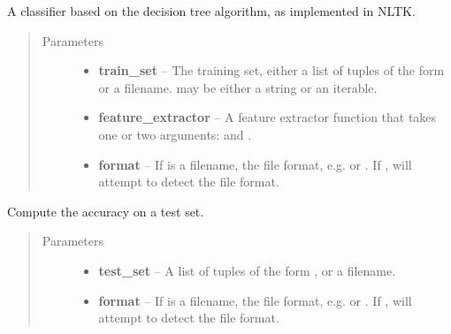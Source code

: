 \documentclass[letterpaper,10pt,english]{sphinxmanual}
\begin{document}
\begin{fulllineitems}
\label{api_reference:textblob.classifiers.DecisionTreeClassifier}
A classifier based on the decision tree algorithm, as implemented in
NLTK.
\begin{quote}\begin{description}
\item[{Parameters}] \leavevmode\begin{itemize}
\item {} 
\textbf{train\_set} -- The training set, either a list of tuples of the form
 or a filename.  may be either
a string or an iterable.

\item {} 
\textbf{feature\_extractor} -- A feature extractor function that takes one or
two arguments:  and .

\item {} 
\textbf{format} -- If  is a filename, the file format, e.g.
 or . If , will attempt to detect the
file format.

\end{itemize}

\end{description}\end{quote}


\begin{fulllineitems}
\label{api_reference:textblob.classifiers.DecisionTreeClassifier.accuracy}
Compute the accuracy on a test set.
\begin{quote}\begin{description}
\item[{Parameters}] \leavevmode\begin{itemize}
\item {} 
\textbf{test\_set} -- A list of tuples of the form , or a
filename.

\item {} 
\textbf{format} -- If  is a filename, the file format, e.g.
 or . If , will attempt to detect the
file format.


\end{itemize}
\end{description}
\end{quote}
\end{fulllineitems}
\end{fulllineitems}
\end{document}
